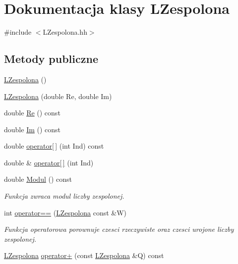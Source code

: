 \hypertarget{class_l_zespolona}{
\section{Dokumentacja klasy LZespolona}
\label{class_l_zespolona}
}


{\ttfamily \#include $<$LZespolona.hh$>$}

\subsection*{Metody publiczne}
\begin{DoxyCompactItemize}
\item 
\hyperlink{class_l_zespolona_a21fe2844a13cde80d7b00b891676296a}{LZespolona} ()
\item 
\hyperlink{class_l_zespolona_a46e0b6cdeb67e49640da865c0d01b671}{LZespolona} (double Re, double Im)
\item 
double \hyperlink{class_l_zespolona_a06ce2b4a22c1ca3f8d97e41b602f078e}{Re} () const 
\item 
double \hyperlink{class_l_zespolona_ad4057ab72b1471f38df277781baa0752}{Im} () const 
\item 
double \hyperlink{class_l_zespolona_a20dc93a471c88944e5c6efbc69b05f46}{operator\mbox{[}$\,$\mbox{]}} (int Ind) const 
\item 
double \& \hyperlink{class_l_zespolona_a77261afaa75950cb785bbffdff4b3cf7}{operator\mbox{[}$\,$\mbox{]}} (int Ind)
\item 
double \hyperlink{class_l_zespolona_aa9f4cab72cd025614fc5e2facb515e6e}{Modul} () const 
\begin{DoxyCompactList}\small\item\em Funkcja zwraca modul liczby zespolonej. \item\end{DoxyCompactList}\item 
int \hyperlink{class_l_zespolona_a4499e73b6e5b883df008be2694698f46}{operator==} (\hyperlink{class_l_zespolona}{LZespolona} const \&W)
\begin{DoxyCompactList}\small\item\em Funkcja operatorowa porownuje czesci rzeczywiste oraz czesci urojone liczby zespolonej. \item\end{DoxyCompactList}\item 
\hyperlink{class_l_zespolona}{LZespolona} \hyperlink{class_l_zespolona_aa744e58a7aede6f7318d4f9d3d9b650d}{operator+} (const \hyperlink{class_l_zespolona}{LZespolona} \&Q) const 

\end{DoxyCompactItemize}
